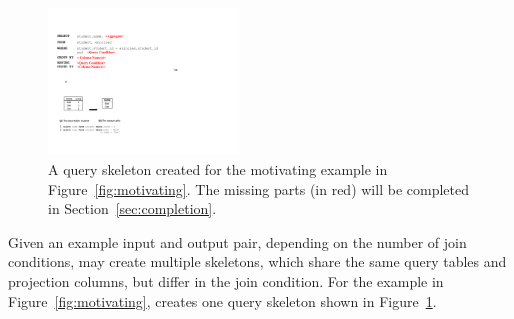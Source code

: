 
\vspace{1mm}



%

\begin{figure}[t]
	\centering
		\includegraphics[width=0.45\textwidth]{sql_skeleton.pdf}
        \vspace{-3mm}
	\caption{A query skeleton created for the motivating example
in Figure~\ref{fig:motivating}. The missing parts (in red) will
be completed in Section~\ref{sec:completion}.}
	\label{fig:skeleton}
\end{figure}


Given an example input and output pair,
depending on the number of join conditions,
\ourtool may create multiple skeletons,
which share the same query tables and
projection columns, but differ in the join condition.
For the example in Figure~\ref{fig:motivating},
\ourtool creates one query skeleton shown in Figure~\ref{fig:skeleton}.






